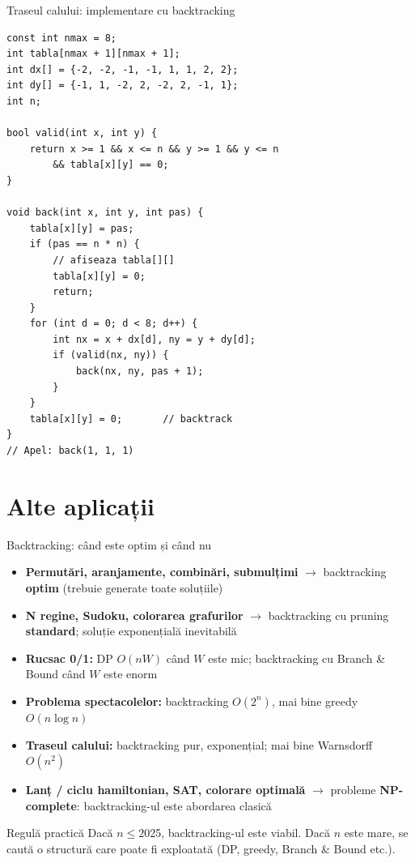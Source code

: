 \documentclass[8pt,mathserif]{beamer}
\begin{document}
\begin{frame}[fragile]{Traseul calului: implementare cu backtracking}
  \begin{lstlisting}
const int nmax = 8;
int tabla[nmax + 1][nmax + 1];
int dx[] = {-2, -2, -1, -1, 1, 1, 2, 2};
int dy[] = {-1, 1, -2, 2, -2, 2, -1, 1};
int n;

bool valid(int x, int y) {
    return x >= 1 && x <= n && y >= 1 && y <= n
        && tabla[x][y] == 0;
}

void back(int x, int y, int pas) {
    tabla[x][y] = pas;
    if (pas == n * n) {
        // afiseaza tabla[][]
        tabla[x][y] = 0;
        return;
    }
    for (int d = 0; d < 8; d++) {
        int nx = x + dx[d], ny = y + dy[d];
        if (valid(nx, ny)) {
            back(nx, ny, pas + 1);
        }
    }
    tabla[x][y] = 0;       // backtrack
}
// Apel: back(1, 1, 1)
  \end{lstlisting}
\end{frame}

\section{Alte aplicații}

\begin{frame}{Backtracking: când este optim și când nu}
  \begin{itemize}
    \item \textbf{Permutări, aranjamente, combinări, submulțimi} $\rightarrow$ backtracking \textbf{optim} (trebuie generate toate soluțiile)
    \item \textbf{N regine, Sudoku, colorarea grafurilor} $\rightarrow$ backtracking cu pruning \textbf{standard}; soluție exponențială inevitabilă
    \item \textbf{Rucsac 0/1:} DP $O(nW)$ când $W$ este mic; \alert{backtracking cu Branch \& Bound} când $W$ este enorm
    \item \textbf{Problema spectacolelor:} backtracking $O(2^n)$, \alert{mai bine greedy $O(n \log n)$}
    \item \textbf{Traseul calului:} backtracking pur, exponențial; \alert{mai bine Warnsdorff $O(n^2)$}
    \item \textbf{Lanț / ciclu hamiltonian, SAT, colorare optimală} $\rightarrow$ probleme \textbf{NP-complete}: backtracking-ul este abordarea clasică
  \end{itemize}
  \begin{block}{Regulă practică}
    Dacă $n \le 20$\textendash{}25, backtracking-ul este viabil. Dacă $n$ este mare, se caută o structură care poate fi exploatată (DP, greedy, Branch \& Bound etc.).
  \end{block}
\end{frame}
\end{document}
